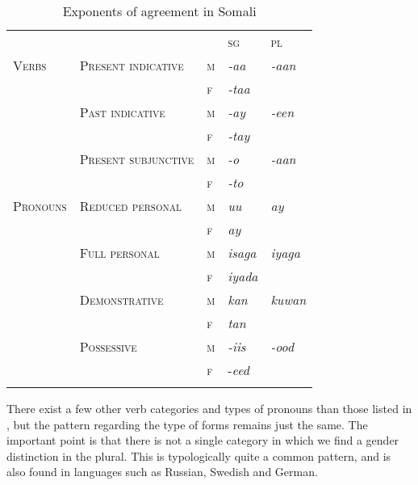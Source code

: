 \documentclass[output=paper]{langsci/langscibook}
\begin{document}
\begin{table}
\caption{Exponents of agreement in Somali}
\label{tab:5}

\begin{tabularx}{\textwidth}{XXXXX} &  &  & {\textsc{sg}} & {\textsc{pl}}\\
\lsptoprule
{\textsc{Verbs}} & {\textsc{Present indicative}} & {\textsc{m}} & {\textit{{}-aa}} & {\textit{{}-aan}}\\
\hhline{~~~~-} &  & {\textsc{f}} & {\textit{{}-taa}} & \\
\hhline{~----} & {\textsc{Past indicative}} & {\textsc{m}} & {\textit{{}-ay}} & {\textit{{}-een}}\\
\hhline{~~~~-} &  & {\textsc{f}} & {\textit{{}-tay}} & \\
\hhline{~----} & {\textsc{Present subjunctive}} & {\textsc{m}} & {\textit{{}-o}} & {\textit{{}-aan}}\\
\hhline{~~~~-} &  & {\textsc{f}} & {\textit{{}-to}} & \\
{\textsc{Pronouns}} & {\textsc{Reduced personal}} & {\textsc{m}} & {\textit{uu}} & {\textit{ay}}\\
\hhline{~~~~-} &  & {\textsc{f}} & {\textit{ay}} & \\
\hhline{~----} & {\textsc{Full personal}} & {\textsc{m}} & {\textit{isaga}} & {\textit{iyaga}}\\
\hhline{~~~~-} &  & {\textsc{f}} & {\textit{iyada}} & \\
\hhline{~----} & {\textsc{Demonstrative}} & {\textsc{m}} & {\textit{kan}} & {\textit{kuwan}}\\
\hhline{~~~~-} &  & {\textsc{f}} & {\textit{tan}} & \\
\hhline{~----} & {\textsc{Possessive}} & {\textsc{m}} & {\textit{{}-iis}} & {\textit{{}-ood}}\\
\hhline{~~~~-} &  & {\textsc{f}} & {{}-\textit{eed}} & \\
\hhline{----~}
\lspbottomrule
\end{tabularx}

\end{table} 

There exist a few other verb categories and types of pronouns than those listed in , but the pattern regarding the type of forms remains just the same. The important point is that there is not a single category in which we find a gender distinction in the plural. This is typologically quite a common pattern, and is also found in languages such as Russian, Swedish and German.
\end{document}
